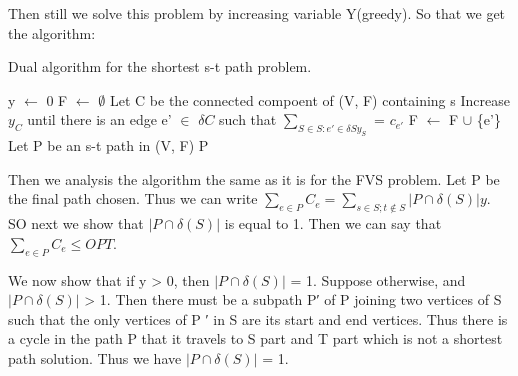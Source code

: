 \documentclass[usletter]{article}
\begin{document}
Then still we solve this problem by increasing variable Y(greedy). So that we get the algorithm:
\begin{algorithm}
\caption{Dual algorithm for the shortest s-t path problem.}
\begin{algorithmic}[1]
\State y $\leftarrow$ 0
\State F $\leftarrow$ $\emptyset$
	\State  Let C be the connected compoent of (V, F) containing s
	\State Increase $y_C$ until there is an edge e' $\in$ $\delta{C}$ such that $\sum_{S \in S:e' \in \delta{S} y_S}$ = $c_{e'}$
	\State F $\leftarrow$ F $\cup$ \{e'\}
\EndWhile
\State Let P be an s-t path in (V, F) 
\State \Return P
\end{algorithmic}
\end{algorithm}

Then we analysis the algorithm the same as it is for the FVS problem. Let P be the final path chosen. Thus we can write $\sum_{e \in P}{C_e} = \sum_{s \in S; t \notin S}{|P \cap \delta(S)| y}$.  SO next we show that $|P \cap \delta(S)|$ is equal to 1. Then we can say that $\sum_{e \in P}{C_e} \le OPT$.

We now show that if y > 0, then $|P \cap \delta(S)|$ = 1. Suppose otherwise, and$|P \cap \delta(S)|$  > 1. Then there must be a subpath P′ of P joining two vertices of S such that the only vertices of P ′ in S are its start and end vertices. Thus there is a cycle in the path P that it travels to S part and T part which is not a shortest path solution. Thus we have $|P \cap \delta(S)|$  = 1.



\end{document}
